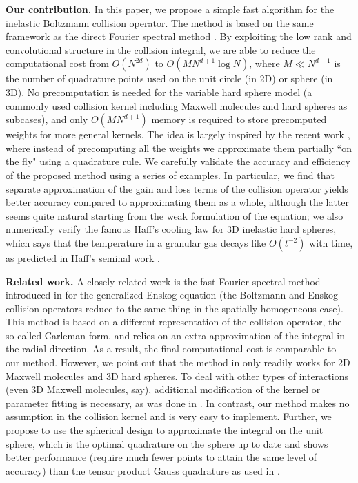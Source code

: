 \documentclass[review,times]{elsarticle}
\begin{document}
{\bf Our contribution.} In this paper, we propose a simple fast algorithm for the inelastic Boltzmann collision operator. The method is based on the same framework as the direct Fourier spectral method \cite{FPT05}. By exploiting the low rank and convolutional structure in the collision integral, we are able to reduce the computational cost from $O(N^{2d})$ to $O(MN^{d+1}\log N)$, where $M \ll N^{d-1}$ is the number of quadrature points used on the unit circle (in 2D) or sphere (in 3D). No precomputation is needed for the variable hard sphere model (a commonly used collision kernel including Maxwell molecules and hard spheres as subcases), and only $O(MN^{d+1})$ memory is required to store precomputed weights for more general kernels. The idea is largely inspired by the recent work \cite{GHHH17}, where instead of precomputing all the weights we approximate them partially ``on the fly" using a quadrature rule. We carefully validate the accuracy and efficiency of the proposed method using a series of examples. In particular, we find that separate approximation of the gain and loss terms of the collision operator yields better accuracy compared to approximating them as a whole, although the latter seems quite natural starting from the weak formulation of the equation; we also numerically verify the famous Haff's cooling law for 3D inelastic hard spheres, which says that the temperature in a granular gas decays like $O(t^{-2})$ with time, as predicted in Haff's seminal work \cite{Haff83}.

{\bf Related work.} A closely related work is the fast Fourier spectral method introduced in \cite{WZR15} for the generalized Enskog equation (the Boltzmann and Enskog collision operators reduce to the same thing in the spatially homogeneous case). This method is based on a different representation of the collision operator, the so-called Carleman form, and relies on an extra approximation of the integral in the radial direction. As a result, the final computational cost is comparable to our method. However, we point out that the method in \cite{WZR15} only readily works for 2D Maxwell molecules and 3D hard spheres. To deal with other types of interactions (even 3D Maxwell molecules, say), additional modification of the kernel or parameter fitting is necessary, as was done in \cite{WWSRZ13}. In contrast, our method makes no assumption in the collision kernel and is very easy to implement. Further, we propose to use the spherical design \cite{Womersley} to approximate the integral on the unit sphere, which is the optimal quadrature on the sphere up to date and shows better performance (require much fewer points to attain the same level of accuracy) than the tensor product Gauss quadrature as used in \cite{WZR15}.
\end{document}
